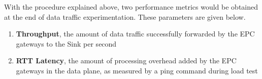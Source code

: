 \documentclass[hidelinks]{report}
\begin{document}
With the procedure explained above, two performance metrics would be obtained at the end of data traffic experimentation. These parameters are given below.

\begin{enumerate}

\item \textbf{Throughput}, the amount of data traffic successfully forwarded by the EPC gateways to the Sink per second

\item \textbf{RTT Latency}, the amount of processing overhead added by the EPC gateways in the data
plane, as measured by a ping command during load test

\end{enumerate}
\end{document}
